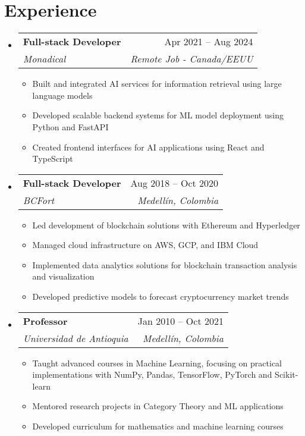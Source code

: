 \documentclass[letterpaper,11pt]{article}
\makeatletter
\newcommand{\resumeSubheading}[4]{
  \vspace{-2pt}
  \item[]
  \begin{tabular*}{\textwidth}{@{\extracolsep{\fill}}l r}
    \textbf{#1} & #2 \\
    \textit{#3} & \textit{#4} \\
  \end{tabular*}
  \vspace{-5pt}
}
\makeatother
\begin{document}
\section{Experience}
\begin{itemize}[leftmargin=0pt, itemindent=0pt, label={}]
\resumeSubheading
{Full-stack Developer}{Apr 2021 -- Aug 2024}
{Monadical}{Remote Job - Canada/EEUU}
\begin{itemize}[leftmargin=*]
    \item Built and integrated AI services for information retrieval using large language models
    \item Developed scalable backend systems for ML model deployment using Python and FastAPI
    \item Created frontend interfaces for AI applications using React and TypeScript
\end{itemize}

\resumeSubheading
{Full-stack Developer}{Aug 2018 -- Oct 2020}
{BCFort}{Medellín, Colombia}
\begin{itemize}[leftmargin=*]
    \item Led development of blockchain solutions with Ethereum and Hyperledger
    \item Managed cloud infrastructure on AWS, GCP, and IBM Cloud
    \item Implemented data analytics solutions for blockchain transaction analysis and visualization
    \item Developed predictive models to forecast cryptocurrency market trends
\end{itemize}

\resumeSubheading
{Professor}{Jan 2010 -- Oct 2021}
{Universidad de Antioquia}{Medellín, Colombia}
\begin{itemize}[leftmargin=*]
    \item Taught advanced courses in Machine Learning, focusing on practical implementations with NumPy, Pandas, TensorFlow, PyTorch and Scikit-learn
    \item Mentored research projects in Category Theory and ML applications
    \item Developed curriculum for mathematics and machine learning courses
\end{itemize}
\end{itemize}
\end{document}
